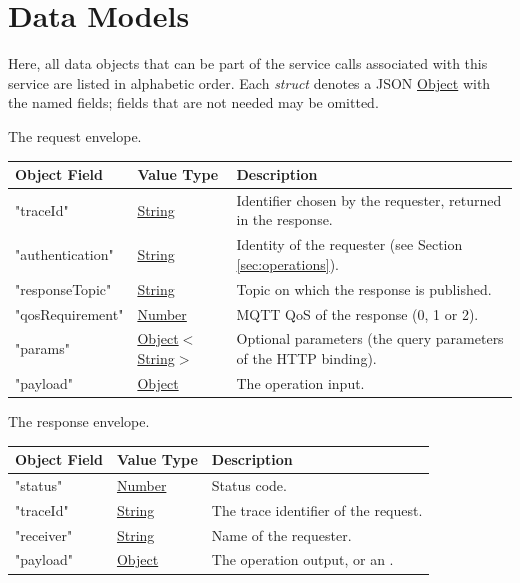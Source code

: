 \documentclass[a4paper]{arrowhead}
\newcommand{\mref}[2][]{{\textcolor{ArrowheadPurple}{\hyperref[sec:model:#2]{\ifstrempty{#1}{#2}{#1}}}}}
\newcommand{\pref}[1]{{\textcolor{ArrowheadGrey}{\hyperref[sec:model:primitives:#1]{#1}}}}
\begin{document}
\section{Data Models}
\label{sec:model}

Here, all data objects that can be part of the service calls associated with this service are listed in alphabetic order.
Each \textit{struct} denotes a JSON \pref{Object} with the named fields; fields that are not needed may be omitted.


The request envelope.

\noindent\begin{tabularx}{\textwidth}{| p{4.25cm} | p{3.5cm} | X |} \hline
\rowcolor{gray!33} Object Field & Value Type & Description \\ \hline
"traceId" & \pref{String} & Identifier chosen by the requester, returned in the response. \\ \hline
"authentication" & \pref{String} & Identity of the requester (see Section \ref{sec:operations}). \\ \hline
"responseTopic" & \pref{String} & Topic on which the response is published. \\ \hline
"qosRequirement" & \pref{Number} & MQTT QoS of the response (0, 1 or 2). \\ \hline
"params" & \pref{Object}$<$\pref{String}$>$ & Optional parameters (the query parameters of the HTTP binding). \\ \hline
"payload" & \pref{Object} & The operation input. \\ \hline
\end{tabularx}


The response envelope.

\noindent\begin{tabularx}{\textwidth}{| p{4.25cm} | p{3.5cm} | X |} \hline
\rowcolor{gray!33} Object Field & Value Type & Description \\ \hline
"status" & \pref{Number} & Status code. \\ \hline
"traceId" & \pref{String} & The trace identifier of the request. \\ \hline
"receiver" & \pref{String} & Name of the requester. \\ \hline
"payload" & \pref{Object} & The operation output, or an \mref{ErrorMessage}. \\ \hline
\end{tabularx}
\end{document}
